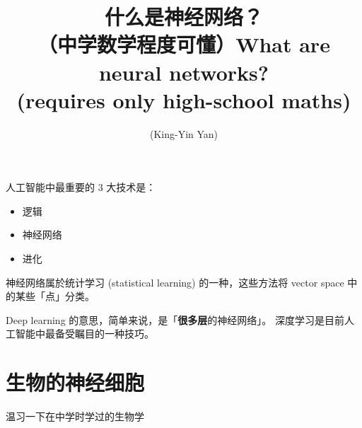 \documentclass[orivec]{llncs}
\title{什么是神经网络？\\
	{\normalsize（中学数学程度可懂）}}
\title{What are neural networks?\\
	{\normalsize (requires only high-school maths)}}
\author{\usebox{\MyName} (King-Yin Yan)
}
\institute{General.Intelligence@Gmail.com}
\newcommand{\cc}[2]{#1}
\newcommand{\cc}[2]{#2}
\newcommand{\emp}[1]{{\color{blue}\textbf{#1}}}
\begin{document}
\maketitle
\setlength{\parindent}{0em}
\setlength{\parskip}{2.8ex}


\cc{
人工智能中最重要的 3 大技术是：
\begin{itemize}
 \item 逻辑
 \item 神经网络
 \item 进化
\end{itemize}
神经网络属於统计学习 (statistical learning) 的一种，这些方法将 vector space 中的某些「点」分类。

Deep learning 的意思，简单来说，是「\emp{很多层}的神经网络」。 深度学习是目前人工智能中最备受瞩目的一种技巧。
}{
The 3 main approaches in artificial intelligence are:
\begin{itemize}
	\item logic
	\item neural networks
	\item evolution
\end{itemize}
Neural networks is a special kind of \textbf{statistical learning}, that operates on ``points'' in a vector space.

Deep learning is the hottest technique in current AI research.  ``Deep'' simply means ``many layers of neural networks''.
}

\section*{\cc{生物的神经细胞}{Biological neurons}}

\cc{
温习一下在中学时学过的生物学 {\Large \smiley}
}{
Let's refresh some high-school biology {\Large \smiley}
}
\end{document}
